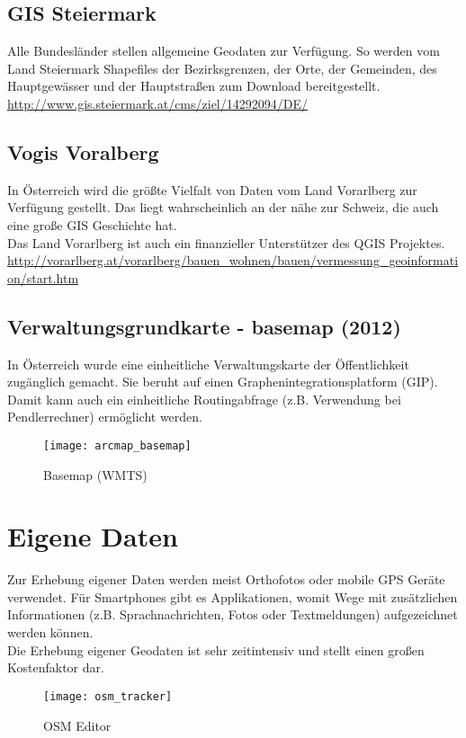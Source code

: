\documentclass[11pt,fleqn]{book} %
\begin{document}
\subsection{GIS Steiermark}
Alle Bundesl\"ander stellen allgemeine Geodaten zur Verf\"ugung. So werden vom Land Steiermark  Shapefiles der Bezirksgrenzen, der Orte, der Gemeinden, des Hauptgew\"asser und der Hauptstra{\ss}en zum Download bereitgestellt. \url{http://www.gis.steiermark.at/cms/ziel/14292094/DE/} 

\subsection{Vogis Voralberg}
In \"Osterreich wird die gr\"o{\ss}te Vielfalt von Daten vom Land Vorarlberg zur Verf\"ugung gestellt. Das liegt wahrscheinlich an der n\"ahe zur Schweiz, die auch eine gro{\ss}e GIS Geschichte hat. \\
Das Land Vorarlberg ist auch ein finanzieller Unterst\"utzer des QGIS Projektes. \url{http://vorarlberg.at/vorarlberg/bauen_wohnen/bauen/vermessung_geoinformation/start.htm}
\subsection{Verwaltungsgrundkarte - basemap (2012)}
In \"Osterreich wurde eine einheitliche Verwaltungskarte der \"Offentlichkeit zug\"anglich gemacht. Sie beruht auf einen Graphenintegrationsplatform (GIP). Damit kann auch ein einheitliche Routingabfrage (z.B. Verwendung bei Pendlerrechner) erm\"oglicht werden. 
\begin{figure}[h]
\centering\texttt{[image: arcmap\_basemap]}
\caption{Basemap (WMTS)}
\end{figure}



\section{Eigene Daten}
Zur Erhebung eigener Daten werden meist Orthofotos oder mobile GPS Ger\"ate verwendet. F\"ur Smartphones gibt es Applikationen, womit Wege mit zus\"atzlichen Informationen (z.B. Sprachnachrichten, Fotos oder Textmeldungen) aufgezeichnet werden k\"onnen.  \\
Die Erhebung eigener Geodaten ist sehr zeitintensiv und stellt einen gro{\ss}en Kostenfaktor dar.


\begin{figure}[h]
\centering\texttt{[image: osm\_tracker]}
\caption{OSM Editor}
\end{figure}
\end{document}
